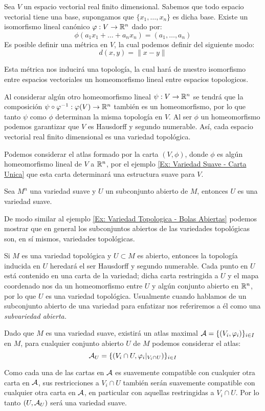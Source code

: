 \begin{example}\label{Ex: Variedad Sauve - Espacios Vectoriales}
	Sea $V$ un espacio vectorial real finito dimensional. Sabemos que todo espacio vectorial tiene una base, supongamos que $\{x_1,\dots,x_n\}$ es dicha base. Existe un isomorfismo lineal canónico $\varphi: V \to \mathbb{R}^n$ dado por:
	\[ \phi(a_1 x_1 + \dots + a_n x_n) = (a_1, \dots, a_n) \]
	Es posible definir una métrica en $V$, la cual podemos definir del siguiente modo:
	\[d(x,y) = \|x - y\|\]

	Esta métrica nos inducirá una topología, la cual hará de nuestro isomorfismo entre espacios vectoriales un homeomorfismo lineal entre espacios topologicos.

	Al considerar algún otro homeomorfismo lineal $\psi: V \to \mathbb{R}^n$ se tendrá que la composición $\psi \circ \varphi^{-1}: \varphi(V) \to \mathbb{R}^n$ también es un homeomorfismo, por lo que tanto $\psi$ como $\phi$ determinan la misma topología en $V$. Al ser $\phi$ un homeomorfismo podemos garantizar que $V$ es Hausdorff y segundo numerable. Así, cada espacio vectorial real finito dimensional es una variedad topológica.

	Podemos considerar el atlas formado por la carta $(V,\phi)$, donde $\phi$ es algún homeomorfismo lineal de $V$ a $\mathbb{R}^n$, por el ejemplo \ref{Ex: Variedad Suave - Carta Unica} que esta carta determinará una estructura suave para $V$.
\end{example}

\begin{example}\label{Ex: Variedad Suave - Subvariedades Suaves}
	Sea $M^n$ una variedad suave y $U$ un subconjunto abierto de $M$, entonces $U$ es una variedad suave.

	De modo similar al ejemplo \ref{Ex: Variedad Topologica - Bolas Abiertas} podemos mostrar que en general los subconjuntos abiertos de las variedades topológicas son, en sí mismos, variedades topológicas.


	Si $M$ es una variedad topológica y $U \subset M$ es abierto, entonces la topología inducida en $U$ heredará el ser Hausdorff y segundo numerable. Cada punto en $U$ está contenido en una carta de la variedad; dicha carta restringida a $U$ y el mapa coordenado nos da un homeomorfismo entre $U$ y algún conjunto abierto en $\mathbb{R}^n$, por lo que $U$ es una variedad topológica. Usualmente cuando hablamos de un subconjunto abierto de una variedad para enfatizar nos referiremos a él como una \it{subvariedad abierta}.

	Dado que $M$ es una variedad suave, existirá un atlas maximal $\mathcal{A} = \{(V_i,\varphi_i) \}_{i \in I}$ en $M$, para cualquier conjunto abierto $U$ de $M$ podemos considerar el atlas:
	\[ \mathcal{A}_U = \{(V_i \cap U, \varphi_i |_{V_i \cap U})\}_{i \in I} \]

	Como cada una de las cartas en $\mathcal{A}$ es suavemente compatible con cualquier otra carta en $\mathcal{A}$, sus restricciones a $V_i \cap U$ también serán suavemente compatible con cualquier otra carta en $\mathcal{A}$, en particular con aquellas restringidas a $V_i \cap U$. Por lo tanto $(U, \mathcal{A}_U)$ será una variedad suave.
\end{example}

